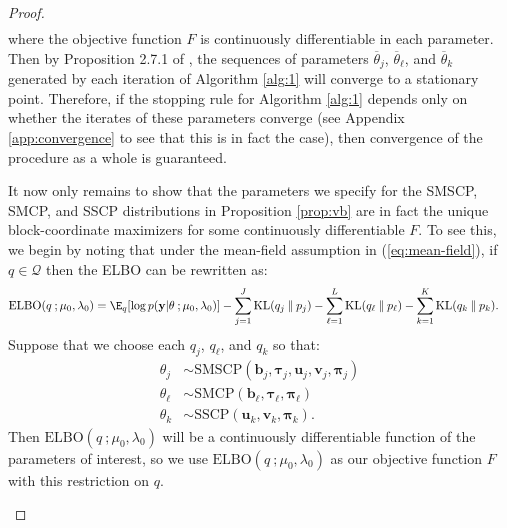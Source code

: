 \begin{proof}
\begin{gather*}
\end{gather*}
where the objective function $F$ is  continuously differentiable in each parameter. Then by Proposition 2.7.1 of \cite{Bertsekas97}, the sequences of parameters $\overline{\theta}_j$, $\overline{\theta}_\ell$, and $\overline{\theta}_k$ generated by each iteration of Algorithm \ref{alg:1} will converge to a stationary point. Therefore, if the stopping rule for Algorithm \ref{alg:1} depends only on whether the iterates of these parameters converge (see Appendix \ref{app:convergence} to see that this is in fact the case), then convergence of the procedure as a whole is guaranteed. 

It now only remains to show that the parameters we specify for the SMSCP, SMCP, and SSCP distributions in Proposition \ref{prop:vb} are in fact the unique block-coordinate maximizers for some continuously differentiable $F$. To see this, we begin by noting that under the mean-field assumption in (\ref{eq:mean-field}), if $q \in \mathcal{Q}$ then the ELBO can be rewritten as:
\begin{align}
    \text{ELBO}(q\:;\mu_0,\lambda_0) &= \E_q[\log p(\mathbf{y}| \theta\:; \mu_0,\lambda_0)] - \sum_{j=1}^J \text{KL}(q_j\:\lVert\: p_j) - \sum_{\ell=1}^L \text{KL}(q_\ell\:\lVert\: p_\ell) - \sum_{k=1}^K \text{KL}(q_k\:\lVert\: p_k). \label{eq:elbo-full}
\end{align}
Suppose that we choose each $q_j$, $q_\ell$, and $q_k$ so that:
\begin{align*}
    \theta_j &\sim \text{SMSCP}(\mathbf{b}_j, \boldsymbol{\tau}_j, \mathbf{u}_j, \mathbf{v}_j, \boldsymbol{\pi}_j)\\
    \theta_\ell &\sim \text{SMCP}(\mathbf{b}_\ell, \boldsymbol{\tau}_\ell, \boldsymbol{\pi}_\ell)\\
    \theta_k &\sim \text{SSCP}(\mathbf{u}_k, \mathbf{v}_k, \boldsymbol{\pi}_k). 
\end{align*}
Then $\text{ELBO}(q\:;\mu_0,\lambda_0)$ will be a continuously differentiable function of the parameters of interest, so we use $\text{ELBO}(q\:;\mu_0,\lambda_0)$ as our objective function $F$ with this restriction on $q$.

\begin{enumerate}[label=\roman*.]


\end{enumerate}
\end{proof}

